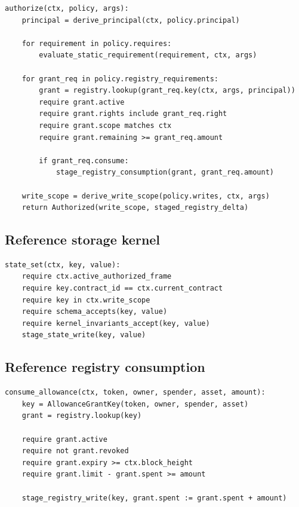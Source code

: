 \begin{lstlisting}
authorize(ctx, policy, args):
    principal = derive_principal(ctx, policy.principal)

    for requirement in policy.requires:
        evaluate_static_requirement(requirement, ctx, args)

    for grant_req in policy.registry_requirements:
        grant = registry.lookup(grant_req.key(ctx, args, principal))
        require grant.active
        require grant.rights include grant_req.right
        require grant.scope matches ctx
        require grant.remaining >= grant_req.amount

        if grant_req.consume:
            stage_registry_consumption(grant, grant_req.amount)

    write_scope = derive_write_scope(policy.writes, ctx, args)
    return Authorized(write_scope, staged_registry_delta)
\end{lstlisting}

\subsection{Reference storage kernel}

\begin{lstlisting}
state_set(ctx, key, value):
    require ctx.active_authorized_frame
    require key.contract_id == ctx.current_contract
    require key in ctx.write_scope
    require schema_accepts(key, value)
    require kernel_invariants_accept(key, value)
    stage_state_write(key, value)
\end{lstlisting}

\subsection{Reference registry consumption}

\begin{lstlisting}
consume_allowance(ctx, token, owner, spender, asset, amount):
    key = AllowanceGrantKey(token, owner, spender, asset)
    grant = registry.lookup(key)

    require grant.active
    require not grant.revoked
    require grant.expiry >= ctx.block_height
    require grant.limit - grant.spent >= amount

    stage_registry_write(key, grant.spent := grant.spent + amount)
\end{lstlisting}
